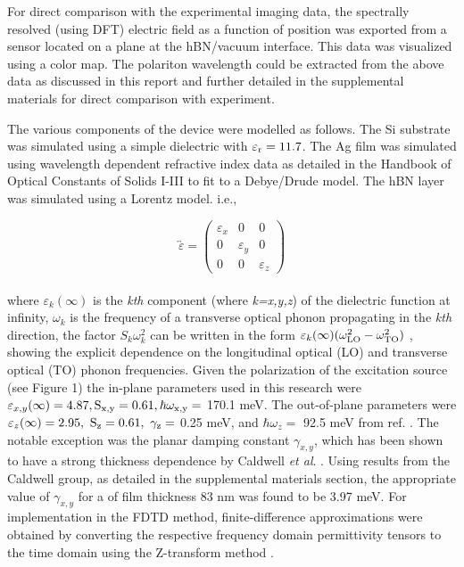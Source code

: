 \documentclass[
reprint,
amsmath,amssymb,
aip,
jap,
floatfix,
]{revtex4-2}
\begin{document}
    For direct comparison with the experimental imaging data, the spectrally resolved (using DFT) electric field as a function of position was exported from a sensor located on a plane at the hBN/vacuum interface. This data was visualized using a color map. The polariton wavelength could be extracted from the above data as discussed in this report and further detailed in the supplemental materials for direct comparison with experiment.

    The various components of the device were modelled as follows. The Si substrate was simulated using a simple dielectric with $\rm \varepsilon_{r}=11.7$. The Ag film was simulated using wavelength dependent refractive index data as detailed in the Handbook of Optical Constants of Solids I-III \cite{Palik:85} to fit to a Debye/Drude model. The hBN layer was simulated using a Lorentz model. i.e.,

          \begin{equation*}
            \overleftrightarrow{\varepsilon} = \begin{pmatrix} \varepsilon_{x}&0&0\\
                                          0&\varepsilon_{y}&0\\
                                          0&0&\varepsilon_{z}\end{pmatrix}
          \end{equation*}
          \\

    where $\varepsilon_{k}(\infty)$ is the \textit{kth} component (where \textit{k=x,y,z}) of the dielectric function at infinity, $\omega_{k} $ is the frequency of a transverse optical phonon propagating in the \textit{kth} direction, the factor $S_{k} \omega_{k}^{2} $ can be written in the form $\varepsilon_{k}(\infty)(\omega_{\rm{LO}}^{2} - \omega_{\rm{TO}}^{2}) $  \cite{Kumar:15}, showing the explicit dependence on the longitudinal optical (LO) and transverse optical (TO) phonon frequencies. Given the polarization of the excitation source (see Figure 1) the in-plane parameters used in this research were $\varepsilon_{x,y}(\infty)= \rm{4.87}, S_{x,y} = \rm{0.61}, \hbar \omega_{x,y} = $ 170.1 meV. The out-of-plane parameters were  $\varepsilon_{z}(\infty)= \rm{2.95}, \ S_{z} = \rm{0.61}, \ \gamma_{z} = $ 0.25 meV, and $\hbar \omega_{z} = $ 92.5 meV from ref. \cite{Jiang:18}. The notable exception was the planar damping constant $\gamma_{x,y} $, which has been shown to have a strong thickness dependence by Caldwell \textit{et al}. \cite{Caldwell:14}. Using results from the Caldwell group, as detailed in the supplemental materials section, the appropriate value of $\gamma_{x,y} $ for a of film thickness 83 nm was found to be 3.97 meV. For implementation in the FDTD method, finite-difference approximations were obtained by converting the respective frequency domain permittivity tensors to the time domain using the Z-transform method \cite{Sullivan:96, Sakurai:17}.
    \\
\end{document}
